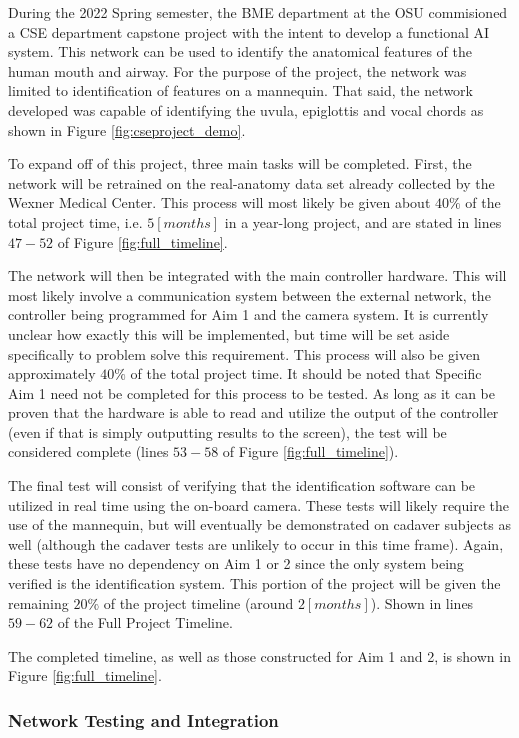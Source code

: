 		During the 2022 Spring semester, the BME department at the OSU commisioned a CSE department capstone project with the intent to develop a functional AI system. This network can be used to identify the anatomical features of the human mouth and airway. For the purpose of the project, the network was limited to identification of features on a mannequin. That said, the network developed was capable of identifying the uvula, epiglottis and vocal chords as shown in Figure \ref{fig:cseproject_demo}.
		
		To expand off of this project, three main tasks will be completed. First, the network will be retrained on the real-anatomy data set already collected by the Wexner Medical Center. This process will most likely be given about $40\%$ of the total project time, i.e. $5[months]$ in a year-long project, and are stated in lines $47-52$ of Figure \ref{fig:full_timeline}.
		
		The network will then be integrated with the main controller hardware. This will most likely involve a communication system between the external network, the controller being programmed for Aim 1 and the camera system. It is currently unclear how exactly this will be implemented, but time will be set aside specifically to problem solve this requirement. This process will also be given approximately $40\%$ of the total project time. It should be noted that Specific Aim 1 need not be completed for this process to be tested. As long as it can be proven that the hardware is able to read and utilize the output of the controller (even if that is simply outputting results to the screen), the test will be considered complete (lines $53-58$ of Figure \ref{fig:full_timeline}).
		
		The final test will consist of verifying that the identification software can be utilized in real time using the on-board camera. These tests will likely require the use of the mannequin, but will eventually be demonstrated on cadaver subjects as well (although the cadaver tests are unlikely to occur in this time frame). Again, these tests have no dependency on Aim 1 or 2 since the only system being verified is the identification system. This portion of the project will be given the remaining $20\%$ of the project timeline (around $2[months]$). Shown in lines $59-62$ of the Full Project Timeline.

		The completed timeline, as well as those constructed for Aim 1 and 2, is shown in Figure \ref{fig:full_timeline}.
		
	\subsubsection{Network Testing and Integration}
	
